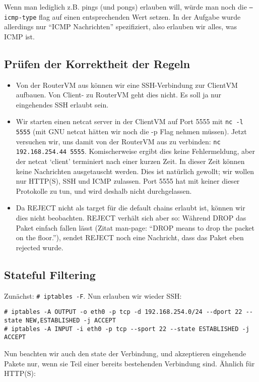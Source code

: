 \documentclass[10pt,a4paper]{article}
\begin{document}
Wenn man lediglich z.B. pings (und pongs) erlauben will, würde man noch die \texttt{--icmp-type} flag auf einen entsprechenden
Wert setzen. In der Aufgabe wurde allerdings nur ``ICMP Nachrichten'' spezifiziert, also erlauben wir alles, was ICMP ist.

\subsection{Prüfen der Korrektheit der Regeln}
\begin{itemize}
\item Von der RouterVM aus können wir eine SSH-Verbindung zur ClientVM aufbauen. Von Client- zu RouterVM geht dies nicht.
	  Es soll ja nur eingehendes SSH erlaubt sein.
\item Wir starten einen netcat server in der ClientVM auf Port 5555 mit \texttt{nc -l 5555} (mit GNU netcat hätten wir noch die -p Flag nehmen müssen).
	  Jetzt versuchen wir, uns damit von der RouterVM aus zu verbinden: \texttt{nc 192.168.254.44 5555}. Komischerweise ergibt dies keine Fehlermeldung,
	  aber der netcat `client' terminiert nach einer kurzen Zeit. In dieser Zeit können keine Nachrichten ausgetauscht werden.
	  Dies ist natürlich gewollt; wir wollen nur HTTP(S), SSH und ICMP zulassen. Port 5555 hat mit keiner dieser Protokolle zu tun, und wird deshalb
	  nicht durchgelassen.
\item Da REJECT nicht als target für die default chains erlaubt ist, können wir dies nicht beobachten. REJECT verhält sich aber so:
	  Während DROP das Paket einfach fallen lässt (Zitat man-page: ``DROP means to drop the packet on the floor.''), sendet REJECT
	  noch eine Nachricht, dass das Paket eben rejected wurde.
\end{itemize}

\subsection{Stateful Filtering}
Zunächst: \texttt{\# iptables -F}.
Nun erlauben wir wieder SSH:

\begin{verbatim}
# iptables -A OUTPUT -o eth0 -p tcp -d 192.168.254.0/24 --dport 22 --state NEW,ESTABLISHED -j ACCEPT
# iptables -A INPUT -i eth0 -p tcp --sport 22 --state ESTABLISHED -j ACCEPT
\end{verbatim}
Nun beachten wir auch den state der Verbindung, und akzeptieren eingehende Pakete nur, wenn sie Teil einer bereits bestehenden Verbindung sind.
Ähnlich für HTTP(S):
\end{document}
